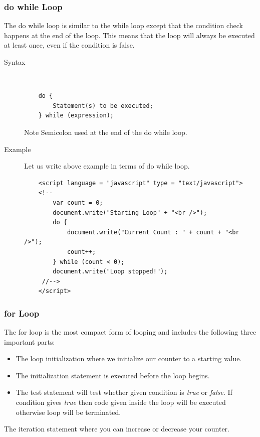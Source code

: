 \documentclass[11pt,a4paper]{article}
\begin{document}
\subsubsection*{do while Loop}
The do while loop is similar to the while loop except that the condition check happens at the end of the loop. This means that the loop will always be executed at least once, even if the condition is false.
\begin{description}
\item[Syntax]\

\begin{verbatim}
    do {
        Statement(s) to be executed;
    } while (expression);
\end{verbatim}

\begin{bclogo}[couleur=blue!5, arrondi=0.3, logo=\bctrombone]{Note}
Semicolon used at the end of the do while loop.
\end{bclogo}

\item[Example]

Let us write above example in terms of do while loop.

\begin{verbatim}
    <script language = "javascript" type = "text/javascript">
    <!--
        var count = 0;
        document.write("Starting Loop" + "<br />");
        do {
            document.write("Current Count : " + count + "<br />");
            count++;
        } while (count < 0);
        document.write("Loop stopped!");
     //-->
    </script>
\end{verbatim}
\end{description}

\subsubsection*{for Loop}

The for loop is the most compact form of looping and includes the following three important parts:
\begin{itemize}
\item The loop initialization where we initialize our counter to a starting value.
\item The initialization statement is executed before the loop begins.
\item The test statement will test whether given condition is \emph{true} or \emph{false}. If condition gives \emph{true} then code given inside the loop will be executed otherwise loop will be terminated.
\end{itemize}
The iteration statement where you can increase or decrease your counter.
\end{document}
